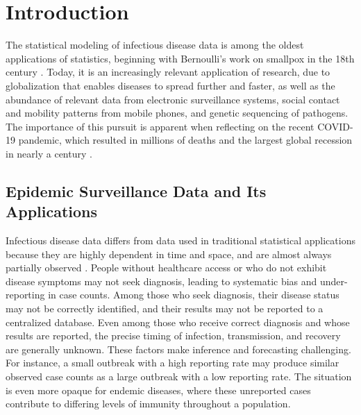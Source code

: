 \chapter{Introduction}
\label{ch:introduction}
\graphicspath{{figures/ch_1/}}

The statistical modeling of infectious disease data is among the oldest applications of statistics, beginning with Bernoulli's work on smallpox in the 18th century \citep{Bernoulli2004}.
Today, it is an increasingly relevant application of research, due to globalization that enables diseases to spread further and faster, as well as the abundance of relevant data from electronic surveillance systems, social contact and mobility patterns from mobile phones, and genetic sequencing of pathogens.
The importance of this pursuit is apparent when reflecting on the recent COVID-19 pandemic, which resulted in millions of deaths and the largest global recession in nearly a century \citep{whocoronavirus,  zumbrun_2020}.

\section{Epidemic Surveillance Data and Its Applications}
\label{sec:epidemic_surveillance_data}

Infectious disease data differs from data used in traditional statistical applications because they are highly dependent in time and space, and are almost always partially observed \citep{held2019handbook}.
People without healthcare access or who do not exhibit disease symptoms may not seek diagnosis, leading to systematic bias and under-reporting in case counts.
Among those who seek diagnosis, their disease status may not be correctly identified, and their results may not be reported to a centralized database.
Even among those who receive correct diagnosis and whose results are reported, the precise timing of infection, transmission, and recovery are generally unknown.
These factors make inference and forecasting challenging.
For instance, a small outbreak with a high reporting rate may produce similar observed case counts as a large outbreak with a low reporting rate.
The situation is even more opaque for endemic diseases, where these unreported cases contribute to differing levels of immunity throughout a population.


